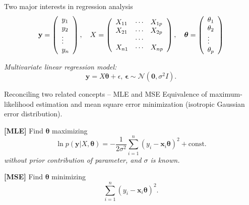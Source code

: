 \documentclass[
  ignorenonframetext,
  aspectratio=169]{beamer}
\begin{document}
\begin{frame}{Two major interests in regression analysis}
\protect\hypertarget{two-major-interests-in-regression-analysis}{}
\[
\mathbf{y} = \left(\begin{array}{l}
y_{1}\\
y_{2}\\
\vdots\\
y_{n}
\end{array}\right),\quad
X = \left(\begin{array}{l l l}
X_{11} & \cdots & X_{1p} \\
X_{21} & \cdots & X_{2p} \\
 & \cdots & \\
X_{n1} & \cdots & X_{np} \\
\end{array}\right),\quad
\boldsymbol{\theta} = \left(\begin{array}{l}
\theta_{1}\\
\theta_{2}\\
\vdots\\
\theta_{p}
\end{array}\right)
\]

\vfill

\emph{Multivariate linear regression model:} \[
\mathbf{y} = X \boldsymbol{\theta} + \epsilon,\, \boldsymbol{\epsilon} \sim \mathcal{N}\!\left(\mathbf{0}, \sigma^{2}I\right).
\]

\vfill


\end{frame}

\begin{frame}{Reconciling two related concepts -- MLE and MSE}
\protect\hypertarget{reconciling-two-related-concepts-mle-and-mse}{}
Equivalence of maximum-likelihood estimation and mean square error
minimization (isotropic Gaussian error distribution).

\vfill

\textbf{{[}MLE{]}} Find \({\boldsymbol{\theta}}\) maximizing \[
\ln p(\mathbf{y}|X,\boldsymbol{\theta})
= - \frac{1}{2\sigma^{2}} \sum_{i=1}^{n} (y_{i} - \mathbf{x}_{i} \boldsymbol{\theta})^{2} + \textrm{const.}
\] \emph{without prior contribution of parameter, and \(\sigma\) is
known.}

\vfill

\textbf{{[}MSE{]}} Find \(\boldsymbol{\theta}\) minimizing \[
\sum_{i=1}^{n} (y_{i} - \mathbf{x}_{i} \boldsymbol{\theta})^{2}.
\]

\vfill
\end{frame}
\end{document}
